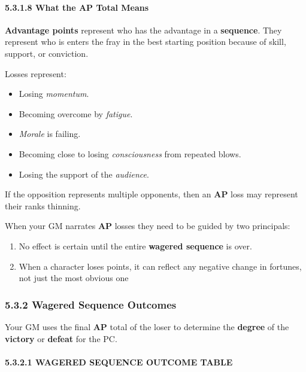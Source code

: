 \documentclass[
  11pt,
]{article}
\providecommand{\tightlist}{%
  \setlength{\itemsep}{0pt}\setlength{\parskip}{0pt}}
\begin{document}
\hypertarget{what-the-ap-total-means}{%
\paragraph{5.3.1.8 What the AP Total
Means}\label{what-the-ap-total-means}}

\textbf{Advantage points} represent who has the advantage in a
\textbf{sequence}. They represent who is enters the fray in the best
starting position because of skill, support, or conviction.

Losses represent:

\begin{itemize}
\tightlist
\item
  Losing \emph{momentum}.
\item
  Becoming overcome by \emph{fatigue}.
\item
  \emph{Morale} is failing.
\item
  Becoming close to losing \emph{consciousness} from repeated blows.
\item
  Losing the support of the \emph{audience}.
\end{itemize}

If the opposition represents multiple opponents, then an \textbf{AP}
loss may represent their ranks thinning.

When your GM narrates \textbf{AP} losses they need to be guided by two
principals:

\begin{enumerate}
\def\labelenumi{\arabic{enumi}.}
\tightlist
\item
  No effect is certain until the entire \textbf{wagered sequence} is
  over.
\item
  When a character loses points, it can reflect any negative change in
  fortunes, not just the most obvious one
\end{enumerate}

\hypertarget{wagered-sequence-outcomes}{%
\subsubsection{5.3.2 Wagered Sequence
Outcomes}\label{wagered-sequence-outcomes}}

Your GM uses the final \textbf{AP} total of the loser to determine the
\textbf{degree} of the \textbf{victory} or \textbf{defeat} for the PC.

\hypertarget{wagered-sequence-outcome-table}{%
\paragraph{5.3.2.1 WAGERED SEQUENCE OUTCOME
TABLE}\label{wagered-sequence-outcome-table}}
\end{document}
